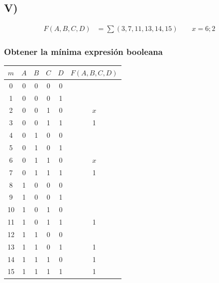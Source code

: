 \subsection{V)}
{\large\begin{align*}\displaystyle F(A, B, C, D) &= \sum(3, 7, 11, 13, 14, 15) \qquad x = 6; 2\end{align*}}

\subsubsection{Obtener la mínima expresión booleana}
\begin{center}
\begin{tabular}{c|cccc|c}
\rowcolor[HTML]{FFCCC9} 
\cellcolor[HTML]{9AFF99}$m$ & $A$ & $B$ & $C$ & $D$ & \cellcolor[HTML]{FFFFC7}$F(A,B,C,D)$ \\ \hline
0                           & 0   & 0   & 0   & 0   &                                    \\
1                           & 0   & 0   & 0   & 1   &                                    \\
2                           & 0   & 0   & 1   & 0   & $x$                                    \\
3                           & 0   & 0   & 1   & 1   & 1                                  \\
4                           & 0   & 1   & 0   & 0   &                                    \\
5                           & 0   & 1   & 0   & 1   &                                    \\
6                           & 0   & 1   & 1   & 0   & $x$                                   \\
7                           & 0   & 1   & 1   & 1   & 1                                  \\
8                           & 1   & 0   & 0   & 0   &                                    \\
9                           & 1   & 0   & 0   & 1   &                                    \\
10                          & 1   & 0   & 1   & 0   &                                    \\
11                          & 1   & 0   & 1   & 1   & 1                                  \\
12                          & 1   & 1   & 0   & 0   &                                    \\
13                          & 1   & 1   & 0   & 1   & 1                                  \\
14                          & 1   & 1   & 1   & 0   & 1                                  \\
15                          & 1   & 1   & 1   & 1   & 1                                 
\end{tabular}
\end{center}
